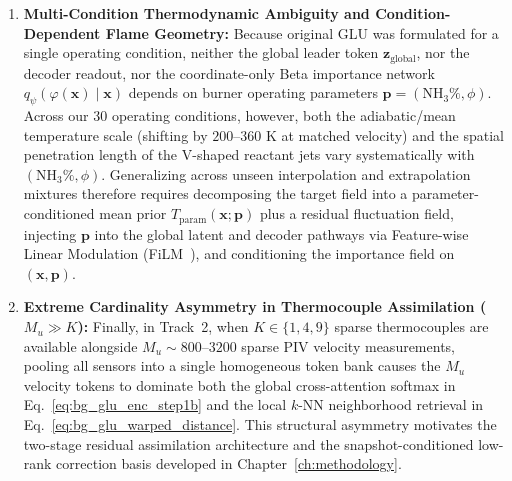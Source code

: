 \begin{enumerate}
    \item \textbf{Multi-Condition Thermodynamic Ambiguity and Condition-Dependent Flame Geometry:} Because original GLU was formulated for a single operating condition, neither the global leader token $\mathbf{z}_{\text{global}}$, nor the decoder readout, nor the coordinate-only Beta importance network $q_\psi(\varphi(\mathbf{x}) \mid \mathbf{x})$ depends on burner operating parameters $\mathbf{p} = (\text{NH}_3\%, \phi)$. Across our 30 operating conditions, however, both the adiabatic/mean temperature scale (shifting by $200\text{--}360\text{ K}$ at matched velocity) and the spatial penetration length of the V-shaped reactant jets vary systematically with $(\text{NH}_3\%, \phi)$. Generalizing across unseen interpolation and extrapolation mixtures therefore requires decomposing the target field into a parameter-conditioned mean prior $\hat{T}_{\text{param}}(\mathbf{x}; \mathbf{p})$ plus a residual fluctuation field, injecting $\mathbf{p}$ into the global latent and decoder pathways via Feature-wise Linear Modulation (FiLM~\cite{perez2018film}), and conditioning the importance field on $(\mathbf{x}, \mathbf{p})$.
    \item \textbf{Extreme Cardinality Asymmetry in Thermocouple Assimilation ($M_u \gg K$):} Finally, in Track~2, when $K \in \{1, 4, 9\}$ sparse thermocouples are available alongside $M_u \sim 800\text{--}3200$ sparse PIV velocity measurements, pooling all sensors into a single homogeneous token bank causes the $M_u$ velocity tokens to dominate both the global cross-attention softmax in Eq.~\eqref{eq:bg_glu_enc_step1b} and the local $k$-NN neighborhood retrieval in Eq.~\eqref{eq:bg_glu_warped_distance}. This structural asymmetry motivates the two-stage residual assimilation architecture and the snapshot-conditioned low-rank correction basis developed in Chapter~\ref{ch:methodology}.
\end{enumerate}
